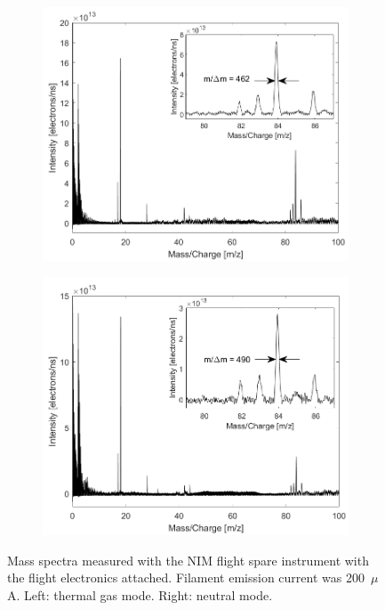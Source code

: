 		\begin{figure}[H]
			\begin{subfigure}{0.5\textwidth} %
				\centering
				\includegraphics[width = \textwidth]{Experiments/FSthMode200uA.png}
			\end{subfigure}
			\begin{subfigure}{0.5\textwidth} %
				\centering
				\includegraphics[width = \textwidth]{Experiments/FSnMode200uA.png}
			\end{subfigure}
			\caption{Mass spectra measured with the NIM flight spare instrument with the flight electronics attached. Filament emission current was 200~$\mu$A. Left: thermal gas mode. Right: neutral mode.}
			\label{fig:ExpFSFlightElMassRes}
		\end{figure}
